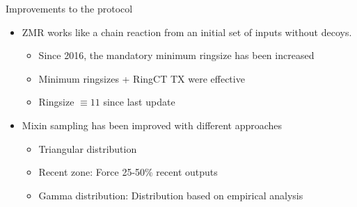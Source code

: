 



\begin{frame}{Improvements to the protocol}
	\begin{itemize}
		\item ZMR works like a chain reaction from an initial set of inputs without decoys.
		\begin{itemize}
			\item Since 2016, the mandatory minimum ringsize has been increased
			\item Minimum ringsizes + RingCT TX were effective
			\item Ringsize $\equiv 11$ since last update
		\end{itemize}
		\item Mixin sampling has been improved with different approaches
		\begin{itemize}
			\item Triangular distribution
			\item Recent zone: Force 25-50\% recent outputs
			\item Gamma distribution: Distribution based on empirical analysis
		\end{itemize}
	\end{itemize}
\end{frame}

